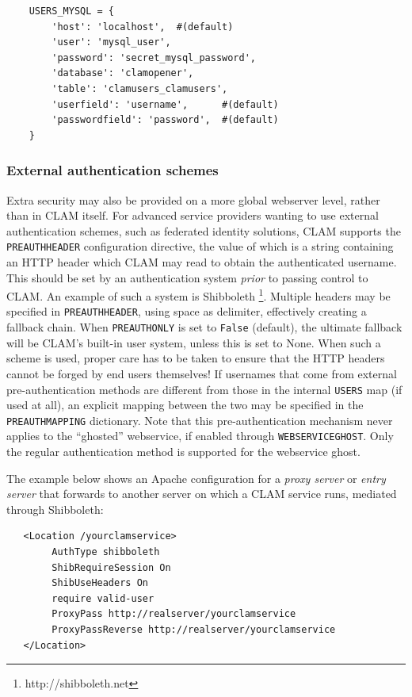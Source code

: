 \documentclass[a4paper,12pt,twoside,openright]{report}
\begin{document}
{ \small
\begin{verbatim}
    USERS_MYSQL = {
        'host': 'localhost',  #(default)
        'user': 'mysql_user',        
        'password': 'secret_mysql_password',
        'database': 'clamopener',
        'table': 'clamusers_clamusers',
        'userfield': 'username',      #(default)
        'passwordfield': 'password',  #(default)
    }
\end{verbatim}
}

\subsubsection{External authentication schemes}

Extra security may also be provided on a more global webserver level, rather
than in CLAM itself. For advanced service providers wanting to use external
authentication schemes, such as federated identity solutions, CLAM supports the
\texttt{PREAUTHHEADER} configuration directive, the value of which is a string
containing an HTTP header which CLAM may read to obtain the authenticated
username. This should be set by an authentication system \emph{prior} to
passing control to CLAM. An example of such a system is Shibboleth
\footnote{http://shibboleth.net}.  Multiple headers may be specified in
\texttt{PREAUTHHEADER}, using space as delimiter, effectively creating a
fallback chain. When \texttt{PREAUTHONLY} is set to \texttt{False} (default),
the ultimate fallback will be CLAM's built-in user system, unless this is set
to None. When such a scheme is used, proper care has to be taken to ensure that
the HTTP headers cannot be forged by end users themselves! If usernames that
come from external pre-authentication methods are different from those in the
internal \texttt{USERS} map (if used at all), an explicit mapping between
the two may be specified in the \texttt{PREAUTHMAPPING} dictionary. Note that
this pre-authentication mechanism never applies to the ``ghosted'' webservice,
if enabled through \texttt{WEBSERVICEGHOST}. Only the regular authentication
method is supported for the webservice ghost.

The example below shows an Apache configuration for a \emph{proxy server} or
\emph{entry server} that forwards to another server on which a CLAM service runs, mediated
through Shibboleth:

{ \small
\begin{verbatim}
   <Location /yourclamservice>
        AuthType shibboleth
        ShibRequireSession On
        ShibUseHeaders On
        require valid-user
        ProxyPass http://realserver/yourclamservice
        ProxyPassReverse http://realserver/yourclamservice
   </Location>
\end{verbatim}
}
\end{document}
